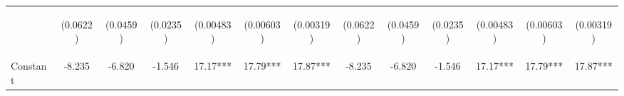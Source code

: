 \documentclass[]{article}
\begin{document}
\begin{center}
\begin{tabular}{lcccccccccccc}
\vspace{4pt} & \begin{footnotesize}(0.0622)\end{footnotesize} & \begin{footnotesize}(0.0459)\end{footnotesize} & \begin{footnotesize}(0.0235)\end{footnotesize} & \begin{footnotesize}(0.00483)\end{footnotesize} & \begin{footnotesize}(0.00603)\end{footnotesize} & \begin{footnotesize}(0.00319)\end{footnotesize} & \begin{footnotesize}(0.0622)\end{footnotesize} & \begin{footnotesize}(0.0459)\end{footnotesize} & \begin{footnotesize}(0.0235)\end{footnotesize} & \begin{footnotesize}(0.00483)\end{footnotesize} & \begin{footnotesize}(0.00603)\end{footnotesize} & \begin{footnotesize}(0.00319)\end{footnotesize} \\
Constant & -8.235 & -6.820 & -1.546 & 17.17*** & 17.79*** & 17.87*** & -8.235 & -6.820 & -1.546 & 17.17*** & 17.79*** & 17.87*** \\

\end{tabular}
\end{center}
\end{document}
